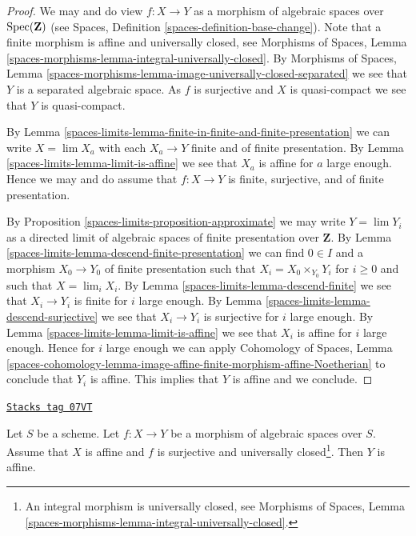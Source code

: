 \begin{proof}
We may and do view $f : X \to Y$ as a morphism of algebraic spaces over
$\operatorname{Spec}(\mathbf{Z})$ (see
Spaces, Definition \ref{spaces-definition-base-change}).
Note that a finite morphism is affine and universally closed, see
Morphisms of Spaces, Lemma
\ref{spaces-morphisms-lemma-integral-universally-closed}.
By Morphisms of Spaces, Lemma
\ref{spaces-morphisms-lemma-image-universally-closed-separated}
we see that $Y$ is a separated algebraic space.
As $f$ is surjective and $X$ is quasi-compact we see that $Y$ is
quasi-compact.

\medskip\noindent
By Lemma \ref{spaces-limits-lemma-finite-in-finite-and-finite-presentation}
we can write $X = \lim X_a$ with each $X_a \to Y$ finite and of
finite presentation. By
Lemma \ref{spaces-limits-lemma-limit-is-affine}
we see that $X_a$ is affine for $a$ large enough.
Hence we may and do assume that $f : X \to Y$ is finite, surjective, and
of finite presentation.

\medskip\noindent
By Proposition \ref{spaces-limits-proposition-approximate} we may write
$Y = \lim Y_i$ as a directed limit of algebraic
spaces of finite presentation over $\mathbf{Z}$.
By Lemma \ref{spaces-limits-lemma-descend-finite-presentation} we can
find $0 \in I$ and a morphism $X_0 \to Y_0$ of finite presentation
such that $X_i = X_0 \times_{Y_0} Y_i$ for $i \geq 0$
and such that $X = \lim_i X_i$. By
Lemma \ref{spaces-limits-lemma-descend-finite}
we see that $X_i \to Y_i$ is finite for $i$ large enough.
By Lemma \ref{spaces-limits-lemma-descend-surjective}
we see that $X_i \to Y_i$ is surjective for $i$ large enough.
By Lemma \ref{spaces-limits-lemma-limit-is-affine} we see that $X_i$ is
affine for $i$ large enough. Hence for $i$ large enough we can apply
Cohomology of Spaces, Lemma
\ref{spaces-cohomology-lemma-image-affine-finite-morphism-affine-Noetherian}
to conclude that $Y_i$ is affine. This implies that $Y$ is affine and
we conclude.
\end{proof}

\begin{proposition}[Affine]
\label{spaces-limits-proposition-affine}
\href{https://stacks.math.columbia.edu/tag/07VT}{\texttt{Stacks tag 07VT}}

Let $S$ be a scheme. Let $f : X \to Y$ be a morphism of algebraic spaces
over $S$. Assume that $X$ is affine and $f$ is surjective and universally
closed\footnote{An integral morphism is universally closed, see
Morphisms of Spaces, Lemma
\ref{spaces-morphisms-lemma-integral-universally-closed}.}. Then $Y$ is affine.
\end{proposition}

